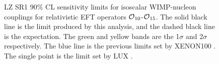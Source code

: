 \begin{figure}[!htbp]
\caption{LZ SR1 90\% CL sensitivity limits for isoscalar WIMP-nucleon couplings for relativistic EFT operators $\operatorname{\mathcal{O}}_{10}$-$\operatorname{\mathcal{O}}_{15}$.
         The solid black line is the limit produced by this analysis, and the dashed black line is the expectation. 
         The green and yellow bands are the 1$\sigma$ and 2$\sigma$ respectively.
         The blue line is the previous limits set by XENON100 \cite{xenon100_eft_ref}.
         The single point is the limit set by LUX \cite{LUX_RUN4_EFT_2021}.}
\label{fig:EFT_Result_SR1_Sensitivity_2}
\end{figure}